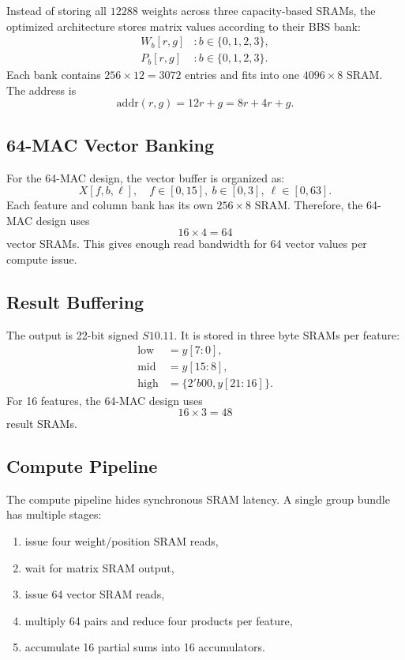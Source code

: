 \documentclass[11pt,a4paper]{article}
\begin{document}
Instead of storing all $12288$ weights across three capacity-based SRAMs, the optimized architecture stores matrix values according to their BBS bank:
\begin{align*}
    W_b[r,g] &: b \in \{0,1,2,3\},\\
    P_b[r,g] &: b \in \{0,1,2,3\}.
\end{align*}
Each bank contains $256 \times 12 = 3072$ entries and fits into one $4096 \times 8$ SRAM. The address is
\begin{equation}
    \mathrm{addr}(r,g) = 12r + g = 8r + 4r + g.
\end{equation}

\subsection{64-MAC Vector Banking}

For the 64-MAC design, the vector buffer is organized as:
\begin{equation}
    X[f,b,\ell], \quad f \in [0,15],\ b \in [0,3],\ \ell \in [0,63].
\end{equation}
Each feature and column bank has its own $256 \times 8$ SRAM. Therefore, the 64-MAC design uses
\begin{equation}
    16 \times 4 = 64
\end{equation}
vector SRAMs. This gives enough read bandwidth for 64 vector values per compute issue.

\subsection{Result Buffering}

The output is 22-bit signed $S10.11$. It is stored in three byte SRAMs per feature:
\begin{align*}
    \mathrm{low}  &= y[7:0],\\
    \mathrm{mid}  &= y[15:8],\\
    \mathrm{high} &= \{2'b00, y[21:16]\}.
\end{align*}
For 16 features, the 64-MAC design uses
\begin{equation}
    16 \times 3 = 48
\end{equation}
result SRAMs.

\subsection{Compute Pipeline}

The compute pipeline hides synchronous SRAM latency. A single group bundle has multiple stages:
\begin{enumerate}[nosep]
    \item issue four weight/position SRAM reads,
    \item wait for matrix SRAM output,
    \item issue 64 vector SRAM reads,
    \item multiply 64 pairs and reduce four products per feature,
    \item accumulate 16 partial sums into 16 accumulators.
\end{enumerate}
\end{document}
